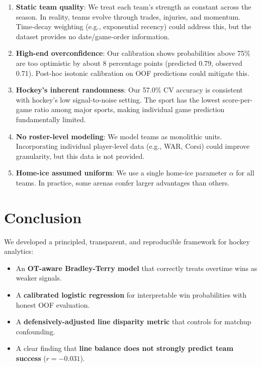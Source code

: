 \documentclass[11pt, a4paper]{article}
\begin{document}
\begin{enumerate}
    \item \textbf{Static team quality}: We treat each team's strength as constant across the season. In reality, teams evolve through trades, injuries, and momentum. Time-decay weighting (e.g., exponential recency) could address this, but the dataset provides no date/game-order information.

    \item \textbf{High-end overconfidence}: Our calibration shows probabilities above 75\% are too optimistic by about 8 percentage points (predicted 0.79, observed 0.71). Post-hoc isotonic calibration on OOF predictions could mitigate this.

    \item \textbf{Hockey's inherent randomness}: Our 57.0\% CV accuracy is consistent with hockey's low signal-to-noise setting. The sport has the lowest score-per-game ratio among major sports, making individual game prediction fundamentally limited.

    \item \textbf{No roster-level modeling}: We model teams as monolithic units. Incorporating individual player-level data (e.g., WAR, Corsi) could improve granularity, but this data is not provided.

    \item \textbf{Home-ice assumed uniform}: We use a single home-ice parameter $\alpha$ for all teams. In practice, some arenas confer larger advantages than others.
\end{enumerate}

\section{Conclusion}
\label{sec:conclusion}

We developed a principled, transparent, and reproducible framework for hockey analytics:

\begin{itemize}
    \item An \textbf{OT-aware Bradley-Terry model} that correctly treats overtime wins as weaker signals.
    \item A \textbf{calibrated logistic regression} for interpretable win probabilities with honest OOF evaluation.
    \item A \textbf{defensively-adjusted line disparity metric} that controls for matchup confounding.
    \item A clear finding that \textbf{line balance does not strongly predict team success} ($r = -0.031$).
\end{itemize}
\end{document}
